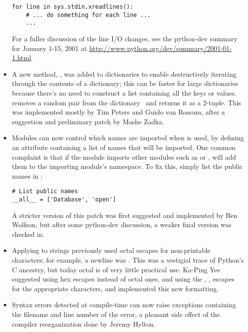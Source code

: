\documentclass{howto}
\begin{document}
\begin{itemize}
\begin{verbatim}
for line in sys.stdin.xreadlines():
    # ... do something for each line ...
    ...
\end{verbatim}

For a fuller discussion of the line I/O changes, see the python-dev
summary for January 1-15, 2001 at
\url{http://www.python.org/dev/summary/2001-01-1.html}.

\item A new method, , was added to dictionaries to
enable destructively iterating through the contents of a dictionary;
this can be faster for large dictionaries because there's no need to
construct a list containing all the keys or values.
 removes a random 
pair from the dictionary~ and returns it as a 2-tuple.  This
was implemented mostly by Tim Peters and Guido van Rossum, after a
suggestion and preliminary patch by Moshe Zadka.
 
\item Modules can now control which names are imported when  is used, by defining an 
attribute containing a list of names that will be imported.  One
common complaint is that if the module imports other modules such as
 or , 
will add them to the importing module's namespace.  To fix this,
simply list the public names in :

\begin{verbatim}
# List public names
__all__ = ['Database', 'open']
\end{verbatim}

A stricter version of this patch was first suggested and implemented
by Ben Wolfson, but after some python-dev discussion, a weaker final
version was checked in.

\item Applying  to strings previously used octal
escapes for non-printable characters; for example, a newline was
.  This was a vestigial trace of Python's C ancestry, but
today octal is of very little practical use.  Ka-Ping Yee suggested
using hex escapes instead of octal ones, and using the ,
,  escapes for the appropriate characters, and
implemented this new formatting.

\item Syntax errors detected at compile-time can now raise exceptions
containing the filename and line number of the error, a pleasant side
effect of the compiler reorganization done by Jeremy Hylton.


\end{itemize}
\end{document}
